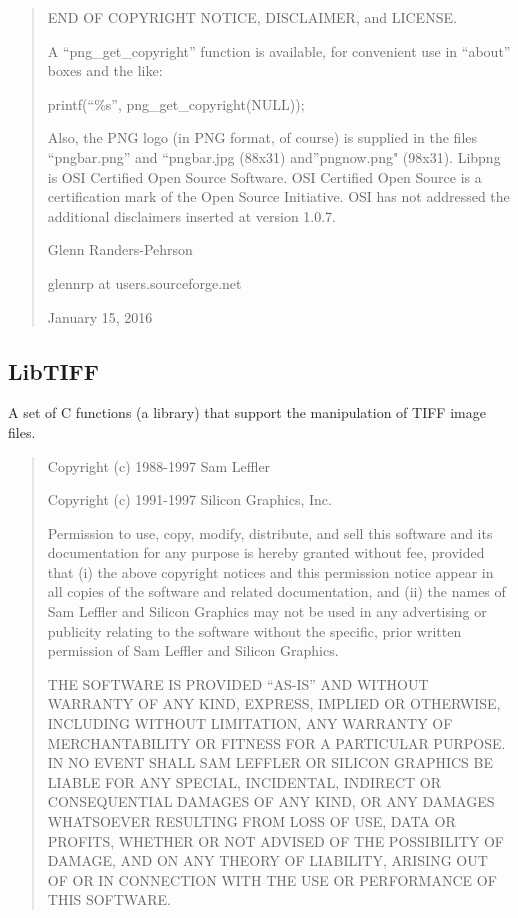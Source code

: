 \documentclass[
]{book}
\theoremstyle{definition}
\theoremstyle{definition}
\theoremstyle{definition}
\theoremstyle{definition}
\theoremstyle{remark}
\begin{document}
\begin{quote}
END OF COPYRIGHT NOTICE, DISCLAIMER, and LICENSE.

A ``png\_get\_copyright'' function is available, for convenient use in ``about''
boxes and the like:

printf(``\%s'', png\_get\_copyright(NULL));

Also, the PNG logo (in PNG format, of course) is supplied in the
files ``pngbar.png'' and ``pngbar.jpg (88x31) and''pngnow.png" (98x31).
Libpng is OSI Certified Open Source Software. OSI Certified Open Source is
a certification mark of the Open Source Initiative. OSI has not addressed
the additional disclaimers inserted at version 1.0.7.

Glenn Randers-Pehrson

glennrp at users.sourceforge.net

January 15, 2016
\end{quote}

\hypertarget{libtiff}{%
\subsection*{LibTIFF}\label{libtiff}}

A set of C functions (a library) that support the manipulation of TIFF image files.

\begin{quote}
Copyright (c) 1988-1997 Sam Leffler

Copyright (c) 1991-1997 Silicon Graphics, Inc.

Permission to use, copy, modify, distribute, and sell this software and
its documentation for any purpose is hereby granted without fee, provided
that (i) the above copyright notices and this permission notice appear in
all copies of the software and related documentation, and (ii) the names of
Sam Leffler and Silicon Graphics may not be used in any advertising or
publicity relating to the software without the specific, prior written
permission of Sam Leffler and Silicon Graphics.

THE SOFTWARE IS PROVIDED ``AS-IS'' AND WITHOUT WARRANTY OF ANY KIND,
EXPRESS, IMPLIED OR OTHERWISE, INCLUDING WITHOUT LIMITATION, ANY
WARRANTY OF MERCHANTABILITY OR FITNESS FOR A PARTICULAR PURPOSE.\\
IN NO EVENT SHALL SAM LEFFLER OR SILICON GRAPHICS BE LIABLE FOR
ANY SPECIAL, INCIDENTAL, INDIRECT OR CONSEQUENTIAL DAMAGES OF ANY KIND,
OR ANY DAMAGES WHATSOEVER RESULTING FROM LOSS OF USE, DATA OR PROFITS,
WHETHER OR NOT ADVISED OF THE POSSIBILITY OF DAMAGE, AND ON ANY THEORY OF
LIABILITY, ARISING OUT OF OR IN CONNECTION WITH THE USE OR PERFORMANCE
OF THIS SOFTWARE.
\end{quote}
\end{document}
